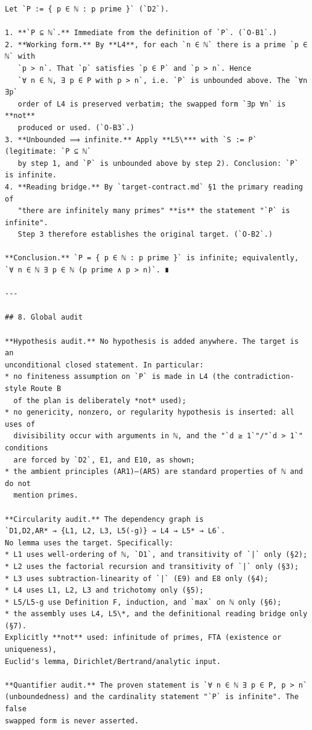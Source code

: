 \documentclass[11pt]{article}
\begin{document}
\begin{verbatim}
Let `P := { p ∈ ℕ : p prime }` (`D2`).

1. **`P ⊆ ℕ`.** Immediate from the definition of `P`. (`O-B1`.)
2. **Working form.** By **L4**, for each `n ∈ ℕ` there is a prime `p ∈ ℕ` with
   `p > n`. That `p` satisfies `p ∈ P` and `p > n`. Hence
   `∀ n ∈ ℕ, ∃ p ∈ P with p > n`, i.e. `P` is unbounded above. The `∀n ∃p`
   order of L4 is preserved verbatim; the swapped form `∃p ∀n` is **not**
   produced or used. (`O-B3`.)
3. **Unbounded ⟹ infinite.** Apply **L5\*** with `S := P` (legitimate: `P ⊆ ℕ`
   by step 1, and `P` is unbounded above by step 2). Conclusion: `P` is infinite.
4. **Reading bridge.** By `target-contract.md` §1 the primary reading of
   "there are infinitely many primes" **is** the statement "`P` is infinite".
   Step 3 therefore establishes the original target. (`O-B2`.)

**Conclusion.** `P = { p ∈ ℕ : p prime }` is infinite; equivalently,
`∀ n ∈ ℕ ∃ p ∈ ℕ (p prime ∧ p > n)`. ∎

---

## 8. Global audit

**Hypothesis audit.** No hypothesis is added anywhere. The target is an
unconditional closed statement. In particular:
* no finiteness assumption on `P` is made in L4 (the contradiction-style Route B
  of the plan is deliberately *not* used);
* no genericity, nonzero, or regularity hypothesis is inserted: all uses of
  divisibility occur with arguments in ℕ, and the "`d ≥ 1`"/"`d > 1`" conditions
  are forced by `D2`, E1, and E10, as shown;
* the ambient principles (AR1)–(AR5) are standard properties of ℕ and do not
  mention primes.

**Circularity audit.** The dependency graph is
`D1,D2,AR* → {L1, L2, L3, L5(-g)} → L4 → L5* → L6`.
No lemma uses the target. Specifically:
* L1 uses well-ordering of ℕ, `D1`, and transitivity of `|` only (§2);
* L2 uses the factorial recursion and transitivity of `|` only (§3);
* L3 uses subtraction-linearity of `|` (E9) and E8 only (§4);
* L4 uses L1, L2, L3 and trichotomy only (§5);
* L5/L5-g use Definition F, induction, and `max` on ℕ only (§6);
* the assembly uses L4, L5\*, and the definitional reading bridge only (§7).
Explicitly **not** used: infinitude of primes, FTA (existence or uniqueness),
Euclid's lemma, Dirichlet/Bertrand/analytic input.

**Quantifier audit.** The proven statement is `∀ n ∈ ℕ ∃ p ∈ P, p > n`
(unboundedness) and the cardinality statement "`P` is infinite". The false
swapped form is never asserted.


\end{verbatim}
\end{document}

